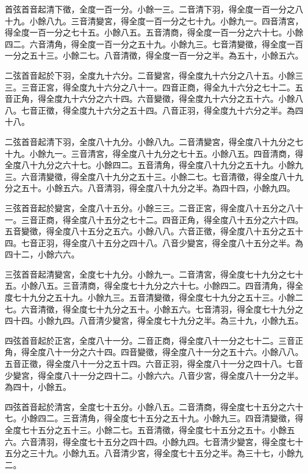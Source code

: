 \begin{pinyinscope}
首弦首音起清下徵，全度一百一分。小餘一三。二音清下羽，得全度一百一分之八十九。小餘八九。三音清變宮，得全度一百一分之七十九。小餘九一。四音清宮，得全度一百一分之七十五。小餘八五。五音清商，得全度一百一分之六十七。小餘四二。六音清角，得全度一百一分之五十九。小餘九三。七音清變徵，得全度一百一分之五十三。小餘二七。八音清徵，得全度一百一分之半。為五十，小餘五六。

二弦首音起於下羽，全度九十六分。二音變宮，得全度九十六分之八十五。小餘三三。三音正宮，得全度九十六分之八十一。四音正商，得全九十六分之七十二。五音正角，得全度九十六分之六十四。六音變徵，得全度九十六分之五十六。小餘八八。七音正徵，得全度九十六分之五十四。八音正羽，得全度九十六分之半。為四十八。

二弦首音起清下羽，全度八十九分。小餘八九。二音清變宮，得全度八十九分之七十九。小餘九一。三音清宮，得全度八十九分之七十五。小餘八五。四音清商，得全度八十九分之六十七。小餘四二。五音清角，得全度八十九分之五十九。小餘九三。六音清變徵，得全度八十九分之五十三。小餘二七。七音清徵，得全度八十九分之五十。小餘五六。八音清羽，得全度八十九分之半。為四十四，小餘九四。

三弦首音起於變宮，全度八十五分。小餘三三。二音正宮，得全度八十五分之八十一。三音正商，得全度八十五分之七十二。四音正角，得全度八十五分之六十四。五音變徵，得全度八十五分之五六。小餘八八。六音正徵，得全度八十五分之五十四。七音正羽，得全度八十五分之四十八。八音少變宮，得全度八十五分之半。為四十二，小餘六六。

三弦首音起清變宮，全度七十九分。小餘九一。二音清宮，得全度七十九分之七十五。小餘八五。三音清商，得全度七十九分之六十七。小餘四二。四音清角，得全度七十九分之五十九。小餘九三。五音清變徵，得全度七十九分之五十三。小餘二七。六音清徵，得全度七十九分之五十。小餘五六。七音清羽，得全度七十九分之四十四。小餘九四。八音清少變宮，得全度七十九分之半。為三十九，小餘九五。

四弦首音起於正宮，全度八十一分。二音正商，得全度八十一分之七十二。三音正角，得全度八十一分之六十四。四音變徵，得全度八十一分之五十六。小餘八八。五音正徵，得全度八十一分之五十四。六音正羽，得全度八十一分之四十八。七音少變宮，得全度八十一分之四十二。小餘六六。八音少宮，得全度八十一分之半。為四十，小餘五。

四弦首音起於清宮，全度七十五分。小餘八五。二音清商，得全度七十五分之六十七。小餘四二。三音清角，得全度七十五分之五十九。小餘九三。四音清變徵，得全度七十五分之五十三。小餘二七。五音清徵，得全度七十五分之五十。小餘五六。六音清羽，得全度七十五分之四十四。小餘九四。七音清少變宮，得全度七十五分之三十九。小餘九五。八音清少宮，得全度七十五分之半。為三十七，小餘九二。


\end{pinyinscope}
